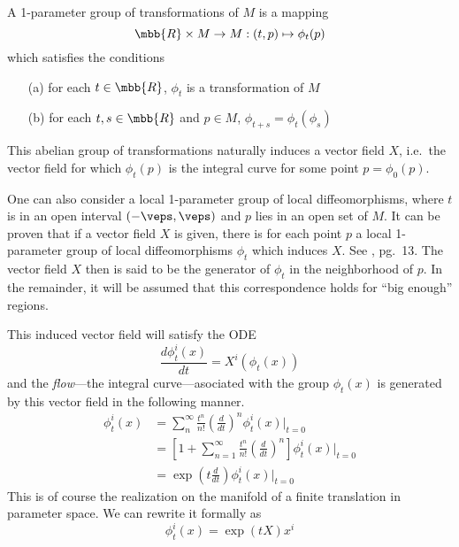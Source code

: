 \documentclass[10pt,reqno]{amsart}
\numberwithin{equation}{section}
\begin{document}
\begin{definition}
	A 1-parameter group of transformations of $M$ is a mapping
	\begin{displaymath}
		\mbb{R} \times M \rightarrow M : (t,p) \mapsto \phi_t(p)
	\end{displaymath}
	which satisfies the conditions
	\begin{itemize}
		\item[(a)] for each $t \in \mbb{R}$, $\phi_t$ is a 
			transformation of $M$
		\item[(b)] for each $t,s \in \mbb{R}$ and $p \in M$, 
			$\phi_{t+s} = \phi_t(\phi_s)$
	\end{itemize}
\end{definition}
This abelian group of transformations naturally induces a vector 
field $X$, i.e.\ the vector field for which $\phi_t(p)$ is the 
integral curve for some point $p = \phi_0(p)$.

One can also consider a local 1-parameter group of local 
diffeomorphisms, where $t$ is in an open interval 
$(-\veps,\veps)$ and $p$ lies in an open set of $M$.
It can be proven that if a vector field $X$ is given, there is 
for each point $p$ a local 1-parameter group of local 
diffeomorphisms $\phi_t$ which induces $X$. See 
\cite{kob1996found}, pg.\ 13. The vector field $X$ then is said 
to be the generator of $\phi_t$ in the neighborhood of $p$. In 
the remainder, it will be assumed that this correspondence holds 
for ``big enough'' regions.

This induced vector field will satisfy the ODE
%
\begin{equation}\label{eq:1parODE}
	\frac{d\phi_t^i(x)}{dt} = X^i(\phi_t(x))
\end{equation}
%
and the \emph{flow}---the integral curve---asociated with the 
group $\phi_t(x)$ is generated by this vector field in the 
following manner.
%
\begin{align*}
	\phi_t^i(x) &= \sum_{n}^\infty \frac{t^n}{n!} \left( 
		\frac{d}{dt} \right)^n \phi_t^i(x)|_{t=0} \\
	&= \left[ 1 + \sum_{n=1}^\infty \frac{t^n}{n!} \left( 
			\frac{d}{dt} \right)^n\right]\phi_t^i(x)|_{t=0} \\
	&= \exp\left(t\frac{d}{dt}\right) \phi_t^i(x)|_{t=0}
\end{align*}
%
This is of course the realization on the manifold of a finite 
translation in parameter space. We can rewrite it formally as
%
\begin{equation}
	\phi_t^i(x) = \exp\left(t X \right) x^i
\end{equation}
%
\end{document}
